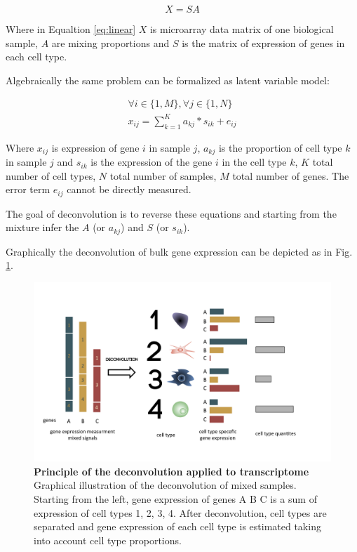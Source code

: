 \documentclass[12pt,]{book}
\theoremstyle{definition}
\theoremstyle{definition}
\theoremstyle{definition}
\theoremstyle{remark}
\begin{document}
\begin{equation}
X = SA  \label{eq:linear}
\end{equation}

Where in Equaltion \eqref{eq:linear} \(X\) is microarray data matrix of
one biological sample, \(A\) are mixing proportions and \(S\) is the
matrix of expression of genes in each cell type.

Algebraically the same problem can be formalized as latent variable
model:

\begin{equation}
\begin{aligned}
\forall i \in \{1,M\},  \forall  j \in \{1,N\} \\
x_{ij}= \sum_{k=1}^K a_{kj} *s_{ik}+ e_{ij} \label{eq:algebraic}
\end{aligned}
\end{equation}

Where \(x_{ij}\) is expression of gene \(i\) in sample \(j\), \(a_{kj}\)
is the proportion of cell type \(k\) in sample \(j\) and \(s_{ik}\) is
the expression of the gene \(i\) in the cell type \(k\), \(K\) total
number of cell types, \(N\) total number of samples, \(M\) total number
of genes. The error term \(e_{ij}\) cannot be directly measured.

The goal of deconvolution is to reverse these equations and starting
from the mixture infer the \(A\) (or \(a_{kj}\)) and \(S\) (or
\(s_{ik}\)).

Graphically the deconvolution of bulk gene expression can be depicted as
in Fig. \ref{fig:deconvolution-cartoon}.

\begin{figure}

{\centering \includegraphics[width=1\linewidth]{figures-ext/deconv} 

}

\caption[Principle of the deconvolution applied to transcriptome]{\textbf{Principle of the
deconvolution applied to transcriptome} Graphical illustration of the
deconvolution of mixed samples. Starting from the left, gene expression
of genes A B C is a sum of expression of cell types 1, 2, 3, 4. After
deconvolution, cell types are separated and gene expression of each cell
type is estimated taking into account cell type proportions.}\label{fig:deconvolution-cartoon}
\end{figure}
\end{document}
